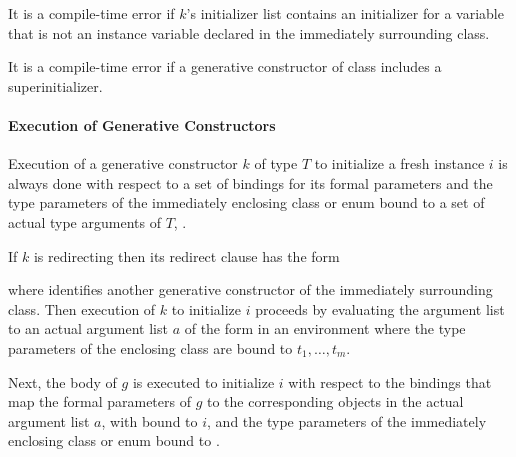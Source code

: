 \documentclass[makeidx]{article}
\begin{document}
\LMHash{}%
It is a compile-time error if $k$'s initializer list contains
an initializer for a variable that is not
an instance variable declared in the immediately surrounding class.


\LMHash{}%
It is a compile-time error if a generative constructor of class 
includes a superinitializer.


\paragraph{Execution of Generative Constructors}

\LMHash{}%
%
Execution of a generative constructor $k$ of type $T$
to initialize a fresh instance $i$
is always done with respect to a set of bindings for its formal parameters
and the type parameters of the immediately enclosing class or enum bound to
a set of actual type arguments of $T$, .


\LMHash{}%
If $k$ is redirecting then its redirect clause has the form

\noindent
{}

where  identifies another generative constructor
of the immediately surrounding class.
Then execution of $k$ to initialize $i$ proceeds by
evaluating the argument list
to an actual argument list $a$ of the form
in an environment where the
type parameters of the enclosing class are bound to
$t_1, \ldots, t_m$.

\LMHash{}%
Next, the body of $g$ is executed to initialize $i$
with respect to the bindings that map
the formal parameters of $g$ to the corresponding objects
in the actual argument list $a$,
with \THIS{} bound to $i$,
and the type parameters of the immediately enclosing class or enum bound to
.
\end{document}
